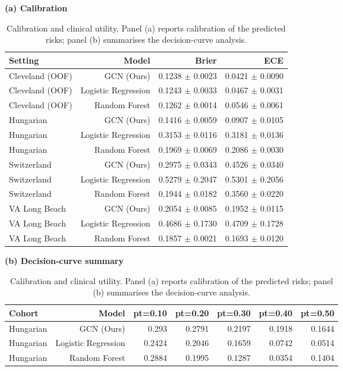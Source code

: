 \begin{table}[t]
\centering
\caption{Calibration and clinical utility. Panel (a) reports calibration of the predicted risks; panel (b) summarises the decision-curve analysis.}
\label{tab:calib}
\label{tab:dca}
\footnotesize
\textbf{(a) Calibration}\\[2pt]
\begin{tabular}{lrrr}
\toprule
Setting & Model & Brier & ECE \\
\midrule
Cleveland (OOF) & GCN (Ours) & 0.1238 $\pm$ 0.0023 & 0.0421 $\pm$ 0.0090 \\
Cleveland (OOF) & Logistic Regression & 0.1243 $\pm$ 0.0033 & 0.0467 $\pm$ 0.0031 \\
Cleveland (OOF) & Random Forest & 0.1262 $\pm$ 0.0014 & 0.0546 $\pm$ 0.0061 \\
Hungarian & GCN (Ours) & 0.1416 $\pm$ 0.0059 & 0.0907 $\pm$ 0.0105 \\
Hungarian & Logistic Regression & 0.3153 $\pm$ 0.0116 & 0.3181 $\pm$ 0.0136 \\
Hungarian & Random Forest & 0.1969 $\pm$ 0.0069 & 0.2086 $\pm$ 0.0030 \\
Switzerland & GCN (Ours) & 0.2975 $\pm$ 0.0343 & 0.4526 $\pm$ 0.0340 \\
Switzerland & Logistic Regression & 0.5279 $\pm$ 0.2047 & 0.5301 $\pm$ 0.2056 \\
Switzerland & Random Forest & 0.1944 $\pm$ 0.0182 & 0.3560 $\pm$ 0.0220 \\
VA Long Beach & GCN (Ours) & 0.2054 $\pm$ 0.0085 & 0.1952 $\pm$ 0.0115 \\
VA Long Beach & Logistic Regression & 0.4686 $\pm$ 0.1730 & 0.4709 $\pm$ 0.1728 \\
VA Long Beach & Random Forest & 0.1857 $\pm$ 0.0021 & 0.1693 $\pm$ 0.0120 \\
\bottomrule
\end{tabular}
\vspace{7pt}
\textbf{(b) Decision-curve summary}\\[2pt]
\begin{tabular}{lrrrrrr}
\toprule
Cohort & Model & pt=0.10 & pt=0.20 & pt=0.30 & pt=0.40 & pt=0.50 \\
\midrule
Hungarian & GCN (Ours) & 0.293 & 0.2791 & 0.2197 & 0.1918 & 0.1644 \\
Hungarian & Logistic Regression & 0.2424 & 0.2046 & 0.1659 & 0.0742 & 0.0514 \\
Hungarian & Random Forest & 0.2884 & 0.1995 & 0.1287 & 0.0354 & 0.1404 \\

\end{tabular}
\end{table}
